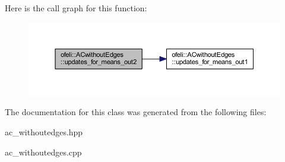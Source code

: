 Here is the call graph for this function\-:\nopagebreak
\begin{figure}[H]
\begin{center}
\leavevmode
\includegraphics[width=350pt]{classofeli_1_1_a_cwithout_edges_a80021d0ca688f3cbf46bccc870706e4c_cgraph}
\end{center}
\end{figure}




The documentation for this class was generated from the following files\-:\begin{DoxyCompactItemize}
\item 
ac\-\_\-withoutedges.\-hpp\item 
ac\-\_\-withoutedges.\-cpp\end{DoxyCompactItemize}
